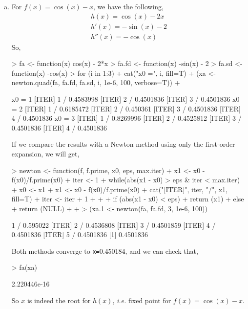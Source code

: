 \documentclass{article}
\begin{document}
    \begin{enumerate}[(a)]
        \item For $f(x) = \cos(x) - x$, we have the following,
            \begin{eqnarray*}
                h(x) = \cos(x) - 2x\\
                h'(x) = -\sin(x) - 2\\
                h''(x) = -\cos(x)
            \end{eqnarray*}
            So, 
\begin{Schunk}
\begin{Sinput}
> fa <- function(x) cos(x) - 2*x
> fa.fd <- function(x) -sin(x) - 2
> fa.sd <- function(x) -cos(x)
> for (i in 1:3){
+     cat("x0 =", i, fill=T)
+     (xa <- newton.quad(fa, fa.fd, fa.sd, i, 1e-6, 100, verbose=T))
+ }
\end{Sinput}
\begin{Soutput}
x0 = 1
[ITER] 1 / 0.4583998
[ITER] 2 / 0.4501836
[ITER] 3 / 0.4501836
x0 = 2
[ITER] 1 / 0.6185472
[ITER] 2 / 0.450361
[ITER] 3 / 0.4501836
[ITER] 4 / 0.4501836
x0 = 3
[ITER] 1 / 0.8269996
[ITER] 2 / 0.4525812
[ITER] 3 / 0.4501836
[ITER] 4 / 0.4501836
\end{Soutput}
\end{Schunk}
    If we compare the results with a Newton method using only the first-order expansion, we will get,
\begin{Schunk}
\begin{Sinput}
> newton <- function(f, f.prime, x0, eps, max.iter){
+     x1 <- x0 - f(x0)/f.prime(x0)
+     iter <- 1
+     while(abs(x1 - x0) > eps & iter < max.iter){
+         x0 <- x1
+         x1 <- x0 - f(x0)/f.prime(x0)
+         cat("[ITER]", iter, "/", x1, fill=T)
+         iter <- iter + 1
+     }
+ 
+     if (abs(x1 - x0) < eps){
+         return (x1)
+     } else {
+         return (NULL)
+     }
+ }
> (xa.1 <- newton(fa, fa.fd, 3, 1e-6, 100))
\end{Sinput}
\begin{Soutput}
[ITER] 1 / 0.595022
[ITER] 2 / 0.4536808
[ITER] 3 / 0.4501859
[ITER] 4 / 0.4501836
[ITER] 5 / 0.4501836
[1] 0.4501836
\end{Soutput}
\end{Schunk}
    Both methods converge to \verb|x=|0.450184, and we can check that,
\begin{Schunk}
\begin{Sinput}
> fa(xa)
\end{Sinput}
\begin{Soutput}
[1] 2.220446e-16
\end{Soutput}
\end{Schunk}
    So $x$ is indeed the root for $h(x)$, \emph{i.e.} fixed point for $f(x) = \cos(x) - x$.


\end{enumerate}
\end{document}
